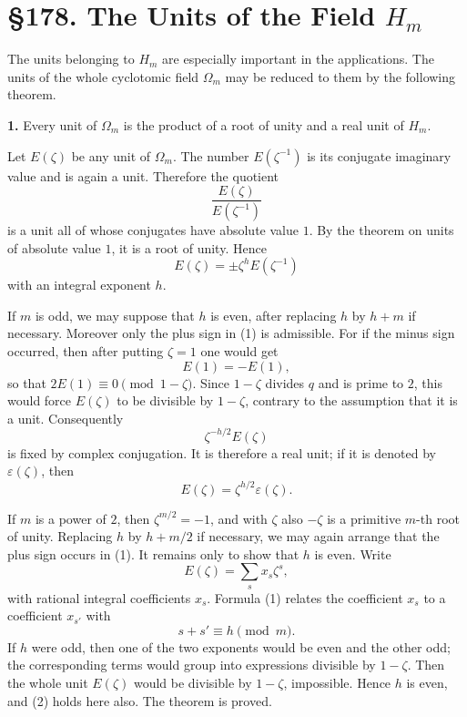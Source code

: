 \documentclass[11pt,a4paper]{book}
\newcommand{\webersection}[2]{\clearpage\section*{\S #1. #2}}
\newcommand{\zetaS}{\zeta}
\providecommand{\Om}{\Omega_m}
\providecommand{\Hm}{H_m}
\begin{document}
\webersection{178}{The Units of the Field \(\Hm\)}

The units belonging to \(\Hm\) are especially important in the applications.  The units of the whole cyclotomic field \(\Om\) may be reduced to them by the following theorem.

\textbf{1.} Every unit of \(\Om\) is the product of a root of unity and a real unit of \(\Hm\).

Let \(E(\zetaS)\) be any unit of \(\Om\).  The number \(E(\zetaS^{-1})\) is its conjugate imaginary value and is again a unit.  Therefore the quotient
\[
  \frac{E(\zetaS)}{E(\zetaS^{-1})}
\]
is a unit all of whose conjugates have absolute value \(1\).  By the theorem on units of absolute value \(1\), it is a root of unity.  Hence
\[
  E(\zetaS)=\pm \zetaS^h E(\zetaS^{-1})
\tag{1}
\]
with an integral exponent \(h\).

If \(m\) is odd, we may suppose that \(h\) is even, after replacing \(h\) by \(h+m\) if necessary.  Moreover only the plus sign in (1) is admissible.  For if the minus sign occurred, then after putting \(\zetaS=1\) one would get
\[
  E(1)=-E(1),
\]
so that \(2E(1)\equiv0\pmod{1-\zetaS}\).  Since \(1-\zetaS\) divides \(q\) and is prime to \(2\), this would force \(E(\zetaS)\) to be divisible by \(1-\zetaS\), contrary to the assumption that it is a unit.  Consequently
\[
  \zetaS^{-h/2}E(\zetaS)
\]
is fixed by complex conjugation.  It is therefore a real unit; if it is denoted by \(\varepsilon(\zetaS)\), then
\[
  E(\zetaS)=\zetaS^{h/2}\varepsilon(\zetaS).
\tag{2}
\]

If \(m\) is a power of \(2\), then \(\zetaS^{m/2}=-1\), and with \(\zetaS\) also \(-\zetaS\) is a primitive \(m\)-th root of unity.  Replacing \(h\) by \(h+m/2\) if necessary, we may again arrange that the plus sign occurs in (1).  It remains only to show that \(h\) is even.  Write
\[
  E(\zetaS)=\sum_s x_s\zetaS^s,
\tag{3}
\]
with rational integral coefficients \(x_s\).  Formula (1) relates the coefficient \(x_s\) to a coefficient \(x_{s'}\) with
\[
  s+s'\equiv h\pmod m.
\]
If \(h\) were odd, then one of the two exponents would be even and the other odd; the corresponding terms would group into expressions divisible by \(1-\zetaS\).  Then the whole unit \(E(\zetaS)\) would be divisible by \(1-\zetaS\), impossible.  Hence \(h\) is even, and (2) holds here also.  The theorem is proved.
\end{document}
